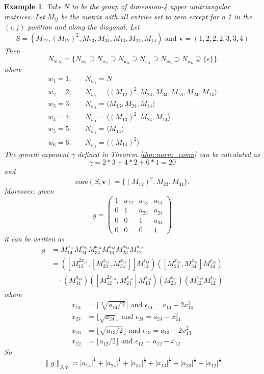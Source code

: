 \documentclass[pdflatex,sn-mathphys-num]{sn-jnl}%
\theoremstyle{thmstyleone}%
\theoremstyle{thmstyletwo}%
\newtheorem{exa}{Example}%
\theoremstyle{thmstylethree}%
\begin{document}
\begin{exa}
\label{exa: m1}
     Take $N$ to be the group of dimension-4 upper unitriangular matrices. Let $M_{ij}$ be the matrix with all entries set to  zero except for a 1 in the $(i,j)$ position and along the diagonal.
Let 
$$S = (M_{12}, (M_{12})^2, M_{23}, M_{34}, M_{13}, M_{24}, M_{14}) \text{ and }\mathbf{v} = (1,2,2,2,3, 3, 4)$$
Then 
$$N_{S,\mathbf{v}} = \{N_{w_1} \supseteq N_{w_2} \supseteq N_{w_3} \supseteq N_{w_4} \supseteq N_{w_5} \supset  N_{w_6} \supsetneq \{e\}\}$$
where 
\begin{align*}
    w_1 = 1; & \quad N_{w_1} = N\\
    w_2 = 2; & \quad N_{w_2}=\langle(M_{12})^2, M_{23}, M_{34}, M_{13}, M_{24}, M_{14} \rangle \\  
    w_3 =  3; & \quad N_{w_3}= \langle M_{13}, M_{24}, M_{14}\rangle \\
    w_4 = 4; &  \quad N_{w_4}=\langle  (M_{13})^2, M_{24}, M_{14}\rangle \\
    w_5 = 5; &  \quad N_{w_5} =\langle M_{14} \rangle \\
    w_6 = 6; &  \quad N_{w_5} =\langle (M_{14})^2 \rangle 
\end{align*}
The growth exponent $\gamma$ defined in Theorem \ref{thm:norm_comp} can be calculated as
$$\gamma = 2* 3 + 4*2 + 6*1 =  20 $$
and 
$$\mbox{core}(S,\mathbf{v}) = \{(M_{12})^2, M_{23}, M_{34}\}.$$
Moreover, given 
$$g = \begin{pmatrix}
1 & a_{12} & a_{13} & a_{14} \\
0 & 1      & a_{23} & a_{24} \\
0 & 0      & 1      & a_{34} \\
0 & 0      & 0      & 1
\end{pmatrix}$$
it can be written as 
\begin{align*}
    g & = M_{14}^{a_{14}}M_{24}^{a_{24}} M_{34}^{a_{34}} M_{13}^{a_{13}}M_{23}^{a_{23}}M_{12}^{a_{12}} \\
    &= \left([M_{12}^{2x_{14}}, [M_{23}^{x_{14}}, M_{34}^{x_{14}}]]M_{14}^{\epsilon_{14}} \right)\left([M_{23}^{x_{24}}, M_{34}^{x_{24}}] M_{24}^{\epsilon_{24}} \right) \\
        & \quad \cdot \left(M_{34}^{a_{34}}  \right) \left([M_{12}^{2x_{13}}, M_{23}^{x_{13}}]M_{13}^{\epsilon_{13}}\right)
\left(M_{23}^{\epsilon_{23}}\right)\left(M_{12}^{x_{12}}M_{12}^{\epsilon_{12}}\right)
\end{align*}
where 
\begin{align*}
x_{14} &= \lfloor \sqrt[3]{a_{14}/2}\rfloor \text{ and }\epsilon_{14} = a_{14} - 2x_{14}^3\\
x_{24} & =\lfloor  \sqrt{a_{24}}\rfloor  \text{ and }\epsilon_{24} = a_{24} -  x_{24}^2 \\
x_{13} & = \lfloor  \sqrt{a_{13}/2}\rfloor  \text{ and }\epsilon_{13} = a_{13} -  2x_{13}^2 \\  
x_{12} & = \lfloor  a_{12}/2 \rfloor \text{ and }\epsilon_{12} = a_{12} - x_{12}
\end{align*}
So 
$$\|g\|_{S,\mathbf{v}} \asymp |a_{14}|^\frac{1}{6} + |a_{24}|^\frac{1}{4} + |a_{34}|^\frac{1}{2} + |a_{13}|^\frac{1}{4} + |a_{23}|^\frac{1}{2} + |a_{12}|^\frac{1}{2}$$
\end{exa}
\end{document}
